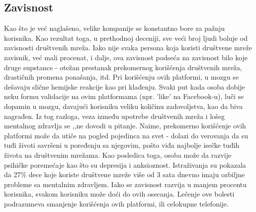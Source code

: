 \documentclass[a4paper]{article}
\begin{document}
{\subsection{Zavisnost}
Kao što je već naglašeno, velike kompanije se konstantno bore za pažnju korisnika. Kao rezultat toga, u prethodnoj deceniji, sve veći broj ljudi boluje od zavisnosti društvenih mreža. Iako nije svaka persona koja koristi društvene mreže zavisnik, već mali procenat, i dalje, ova zavisnost podseća na zavisnost bilo koje druge supstance - otežan prestanak prekomernog korišćenja društvenih mreža, drastičnih promena ponašanja, itd. Pri korišćenju ovih platformi, u mozgu se dešavaju slične hemijske reakcije kao pri klađenju. Svaki put kada osoba dobije neku formu validacije na ovim platformama (npr. 'like' na Facebook-u), luči se dopamin u mozgu, davajući korisniku veliku količinu zadovoljstva, kao da biva nagrađen. Iz tog razloga, veza između upotrebe društvenih mreža i lošeg mentalnog zdravlja se ‚‚ne dovodi u pitanje. Naime, prekomerno korišćenje ovih platformi može da utiče na pogled pojedinca na svet - dolazi do verovanja da su tuđi životi savršeni u poređenju sa njegovim, pošto viđa najbolje isečke tuđih života na društvenim mrežama. Kao posledica toga, osoba može da razvije  psihičke poremećaje kao što su depresija i anksioznost. Istraživanja su pokazala da 27\% dece koje koriste društvene mreže više od 3 sata dnevno imaju ozbiljne probleme sa mentalnim zdravljem.
\newline 
Iako se zavisnost razvija u manjem procentu korisnika, svakom korisniku može doći do ovih osecanja. Lečenje ove bolesti podrazumeva smanjenje korišćenja ovih platformi, ili celokupne telefonije.
 






}
\end{document}
